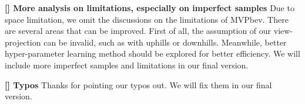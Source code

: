 \documentclass[sigconf,authordraft]{acmart}
\begin{document}

\noindent \textbf{[\rfour] More analysis on limitations, especially on imperfect samples} Due to space limitation, we omit the discussions on the limitations of MVPbev. There are several areas that can be improved. First of all, the assumption of our view-projection can be invalid, such as with uphills or downhills. Meanwhile, better hyper-parameter learning method should be explored for better efficiency. We will include more imperfect samples and limitations in our final version.

\noindent \textbf{[\rfour] Typos} Thanks for pointing our typos out. We will fix them in our final version.




\end{document}
